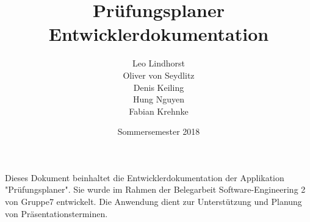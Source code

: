 \documentclass{scrartcl}
\begin{document}
	\title{Prüfungsplaner \\ Entwicklerdokumentation}
	\author{Leo Lindhorst\\
		Oliver von Seydlitz\\
		Denis Keiling\\
		Hung Nguyen\\
		Fabian Krehnke}
	\date{Sommersemester 2018}
	\maketitle
	
	Dieses Dokument beinhaltet die Entwicklerdokumentation der Applikation "Prüfungsplaner". Sie wurde im Rahmen der Belegarbeit Software-Engineering 2 von Gruppe7 entwickelt. Die Anwendung dient zur Unterstützung und Planung von Präsentationsterminen.
	
	\tableofcontents
	
\end{document}
